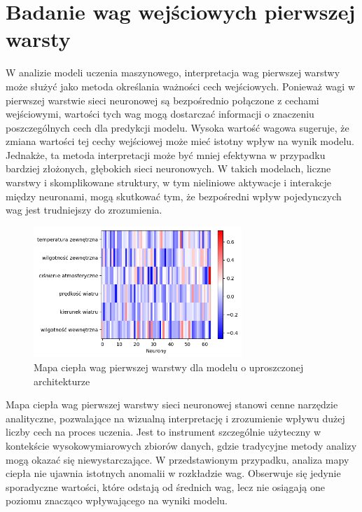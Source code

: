 \documentclass[a4paper,twoside,12pt]{book}
\begin{document}
\section{Badanie wag wejściowych pierwszej warsty}
W analizie modeli uczenia maszynowego, interpretacja wag pierwszej warstwy może służyć jako metoda określania ważności cech wejściowych. Ponieważ wagi w pierwszej warstwie sieci neuronowej są bezpośrednio połączone z cechami wejściowymi, wartości tych wag mogą dostarczać informacji o znaczeniu poszczególnych cech dla predykcji modelu. Wysoka wartość wagowa sugeruje, że zmiana wartości tej cechy wejściowej może mieć istotny wpływ na wynik modelu. Jednakże, ta metoda interpretacji może być mniej efektywna w przypadku bardziej złożonych, głębokich sieci neuronowych. W takich modelach, liczne warstwy i skomplikowane struktury, w tym nieliniowe aktywacje i interakcje między neuronami, mogą skutkować tym, że bezpośredni wpływ pojedynczych wag jest trudniejszy do zrozumienia.
\begin{figure}[!h]
	\centering
	\includegraphics[width=0.7\textwidth]{img/heatmap1.png}
	\caption{Mapa ciepła wag pierwszej warstwy dla modelu o uproszczonej architekturze}
	\label{fig:etykieta-rysunku}
\end{figure}

Mapa ciepła wag pierwszej warstwy sieci neuronowej stanowi cenne narzędzie analityczne, pozwalające na wizualną interpretację i zrozumienie wpływu dużej liczby cech na proces uczenia. Jest to instrument szczególnie użyteczny w kontekście wysokowymiarowych zbiorów danych, gdzie tradycyjne metody analizy mogą okazać się niewystarczające. W przedstawionym przypadku, analiza mapy ciepła nie ujawnia istotnych anomalii w rozkładzie wag. Obserwuje się jedynie sporadyczne wartości, które odstają od średnich wag, lecz nie osiągają one poziomu znacząco wpływającego na wyniki modelu.
\end{document}
